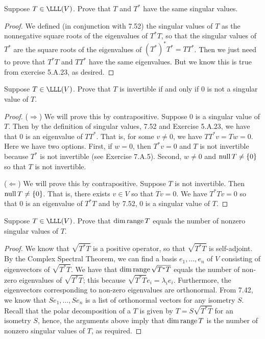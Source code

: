 \begin{exercise}{11}
  Suppose $T\in\LLL(V)$. Prove that $T$ and $T^\ast$ have the same singular values.
\end{exercise}
\begin{proof}
 We defined (in conjunction with 7.52) the singular values of $T$ as the nonnegative square roots of the eigenvalues of $T^\ast T$, so that the singular values of $T^\ast$ are the square roots of the eigenvalues of $(T^\ast)^\ast T^\ast =TT^\ast$. Then we just need to prove that $T^\ast T$ and $TT^\ast$ have the same eigenvalues. But we know this is true from exercise 5.A.23, as desired.
\end{proof}

\begin{exercise}{13}
  Suppose $T\in\LLL(V)$. Prove that $T$ is invertible if and only if 0 is not a singular value of $T$.
\end{exercise}
\begin{proof}
 ($\Rightarrow$) We will prove this by contrapositive. Suppose 0 is a singular value of $T$. Then by the definition of singular values, 7.52 and Exercise 5.A.23, we have that 0 is an eigenvalue of $TT^\ast$. That is, for some $v\neq 0$, we have $TT^\ast v =Tw =0$. Here we have two options. First, if $w=0$, then $T^\ast v=0$ and $T$ is not invertible because $T^\ast$ is not invertible (see Exercise 7.A.5). Second, $w\neq 0$ and $\operatorname*{null} T\neq\{0\}$ so that $T$ is not invertible.

 ($\Leftarrow$) We will prove this by contrapositive. Suppose $T$ is not invertible. Then $\operatorname*{null} T\neq\{0\}$. That is, there exists $v\in V$ so that $Tv=0$. We have $T^\ast Tv =0$ so that $0$ is an eigenvalue of $T^\ast T$ and by 7.52, 0 is a singular value of $T$.
\end{proof}

\begin{exercise}{14}
  Suppose $T\in\LLL(V)$. Prove that $\dim\operatorname*{range} T$ equals the number of nonzero singular values of $T$.
\end{exercise}
\begin{proof}
 We know that $\sqrt{T^\ast T}$ is a positive operator, so that $\sqrt{T^\ast T}$ is self-adjoint. By the Complex Spectral Theorem, we can find a basis $e_1,\dots,e_n$ of $V$ consisting of eigenvectors of $\sqrt{T^\ast T}$. We have that $\dim\operatorname*{range} \sqrt{T^\ast T}$ equals the number of non-zero eigenvalues of $\sqrt{T^\ast T}$; this because $\sqrt{T^\ast T}e_i =\lambda_ie_i$. Furthermore, the eigenvectors corresponding to non-zero eigenvalues are orthonormal. From 7.42, we know that $Se_1,\dots,Se_n$ is a list of orthonormal vectors for any isometry $S$. Recall that the polar decomposition of a $T$ is given by $T =S\sqrt{T^\ast T}$ for an isometry $S$, hence, the arguments above imply that $\dim\operatorname*{range} T$ is the number of nonzero singular values of $T$, as required.
\end{proof}

